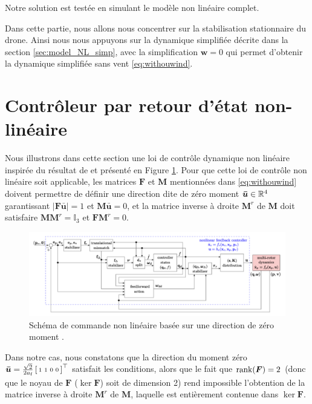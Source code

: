Notre solution est testée en simulant le modèle non linéaire complet.

Dans cette partie, nous allons nous concentrer sur la stabilisation stationnaire du drone. Ainsi nous nous appuyons sur la dynamique simplifiée décrite dans la section \ref{sec:model_NL_simp}, avec la simplification $\boldsymbol{w} = 0$ qui permet d'obtenir la dynamique simplifiée sans vent \eqref{eq:withouwind}. 



\section{Contrôleur par retour d'état non-linéaire}
Nous illustrons dans cette section une loi de contrôle dynamique non linéaire inspirée du résultat de \cite{2020e-MicCenZacFra} et présenté en Figure \ref{fig:NLZeroMoment}. Pour que cette loi de contrôle non linéaire soit applicable, les matrices $\boldsymbol{F}$ et $\boldsymbol{M}$ mentionnées dans \eqref{eq:withouwind} doivent permettre de définir une direction dite de zéro moment $\boldsymbol{\bar u} \in {\mathbb R}^4$ garantissant
$|\boldsymbol{F}\boldsymbol{\bar u}| = 1$ et $\boldsymbol{M} \boldsymbol{\bar u}=0$, et la matrice inverse à droite $\boldsymbol{M}^r$ de $\boldsymbol{M}$ doit satisfaire $\boldsymbol{M} \boldsymbol{M}^r = \mathbb{I}_3$ et $\boldsymbol{F}\boldsymbol{M}^r=0$. 

\begin{figure}[ht!]
  \centering
  \includegraphics[trim=0cm 0.6cm 0cm 0.6cm,clip,width=0.9\columnwidth]{figures/NLZeroMoment.png}
  \caption{Schéma de commande non linéaire basée sur une direction de zéro moment \cite{2020e-MicCenZacFra}.}
  \label{fig:NLZeroMoment}
\end{figure}

Dans notre cas, nous constatons que la direction du moment zéro $\boldsymbol{\bar u} = \frac{\sqrt{2}}{2a_{\text{f}}}\left[ \begin{smallmatrix}1&1&0&0 \end{smallmatrix} \right]^\top$ satisfait les conditions, alors que le fait que $\operatorname{rank}(\boldsymbol{F}) = 2$ (donc que le noyau de $\boldsymbol{F}$ ($\ker \boldsymbol{F}$) soit de dimension 2) rend impossible l'obtention de la matrice inverse à droite $\boldsymbol{M}^r$ de $\boldsymbol{M}$, laquelle est entièrement contenue dans $\ker \boldsymbol{F}$.

